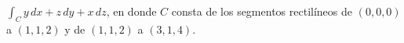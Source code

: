 \item $\int_C y \, dx + z \, dy + x \, dz$, en donde $C$ consta de los segmentos rectilíneos de $(0, 0, 0)$ a $(1, 1, 2)$ y de $(1, 1, 2)$ a $(3, 1, 4)$.
